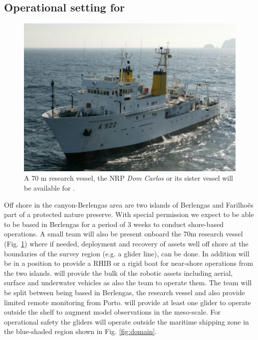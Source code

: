 \subsection{Operational setting for \proj}

\begin{figure}
  \vspace{-0.75cm}
  \centering
  \includegraphics[scale=0.25]{fig/dom-carlos.jpg}
  \caption{A 70 m \inst research vessel, the NRP \emph{Dom Carlos} or
    its sister vessel will be available for \proje.}
 \label{fig:vessel}
  \vspace{-0.5cm}
\end{figure}

Off shore in the \naz canyon-Berlengas area are two islands of
Berlengas and Farilho\~es part of a protected nature preserve. With
special permission we expect to be able to be based in Berlengas for a
period of 3 weeks to conduct shore-based operations. A small team will
also be present onboard the 70m \inst research vessel
(Fig. \ref{fig:vessel}) where if needed, deployment and recovery of
assets well off shore at the boundaries of the survey region (e.g. a
glider line), can be done. In addition \inst will be in a position to
provide a RHIB or a rigid boat for near-shore operations from the two
islands. \univ will provide the bulk of the robotic assets including
aerial, surface and underwater vehicles as also the team to operate
them. The team will be split between being based in Berlengas, the
research vessel and also provide limited remote monitoring from
Porto. \soc will provide at least one glider to operate outside the
shelf to augment model observations in the meso-scale. For operational
safety the gliders will operate outside the maritime shipping zone in
the blue-shaded region shown in Fig. \ref{fig:domain}.

